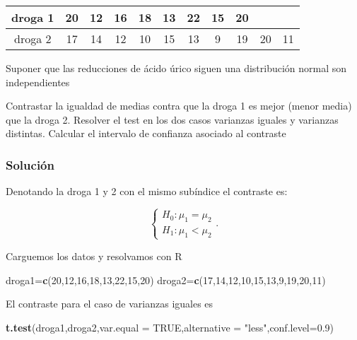 \documentclass[
]{article}
\newenvironment{Shaded}{\begin{snugshade}}{\end{snugshade}}
\newcommand{\DataTypeTok}[1]{\textcolor[rgb]{0.13,0.29,0.53}{#1}}
\newcommand{\DecValTok}[1]{\textcolor[rgb]{0.00,0.00,0.81}{#1}}
\newcommand{\FloatTok}[1]{\textcolor[rgb]{0.00,0.00,0.81}{#1}}
\newcommand{\KeywordTok}[1]{\textcolor[rgb]{0.13,0.29,0.53}{\textbf{#1}}}
\newcommand{\NormalTok}[1]{#1}
\newcommand{\OtherTok}[1]{\textcolor[rgb]{0.56,0.35,0.01}{#1}}
\newcommand{\StringTok}[1]{\textcolor[rgb]{0.31,0.60,0.02}{#1}}
\begin{document}
\begin{center}
\begin{tabular}{|c|c|c|c|c|c|c|c|c|c|c|}
droga 1 & 20 & 12 & 16 & 18 & 13 & 22 & 15 & 20\\ \hline droga 2 & 17 & 14 & 12 & 10 & 15 &
13 & 9 & 19 & 20 & 11
\end{tabular}
\end{center}

Suponer que las reducciones de ácido úrico siguen una distribución
normal son independientes

Contrastar la igualdad de medias contra que la droga 1 es mejor (menor
media) que la droga 2. Resolver el test en los dos casos varianzas
iguales y varianzas distintas. Calcular el intervalo de confianza
asociado al contraste

\hypertarget{soluciuxf3n-2}{%
\subsubsection{Solución}\label{soluciuxf3n-2}}

Denotando la droga 1 y 2 con el mismo subíndice el contraste es:

\[
\left\{
\begin{array}{ll}
H_{0}:\mu_1=\mu_2\\
H_{1}:\mu_1 < \mu_2 
\end{array}
\right..
\]

Carguemos los datos y resolvamos con R

\begin{Shaded}
\begin{Highlighting}[]
\NormalTok{droga1=}\KeywordTok{c}\NormalTok{(}\DecValTok{20}\NormalTok{,}\DecValTok{12}\NormalTok{,}\DecValTok{16}\NormalTok{,}\DecValTok{18}\NormalTok{,}\DecValTok{13}\NormalTok{,}\DecValTok{22}\NormalTok{,}\DecValTok{15}\NormalTok{,}\DecValTok{20}\NormalTok{)}
\NormalTok{droga2=}\KeywordTok{c}\NormalTok{(}\DecValTok{17}\NormalTok{,}\DecValTok{14}\NormalTok{,}\DecValTok{12}\NormalTok{,}\DecValTok{10}\NormalTok{,}\DecValTok{15}\NormalTok{,}\DecValTok{13}\NormalTok{,}\DecValTok{9}\NormalTok{,}\DecValTok{19}\NormalTok{,}\DecValTok{20}\NormalTok{,}\DecValTok{11}\NormalTok{)}
\end{Highlighting}
\end{Shaded}

El contraste para el caso de varianzas iguales es

\begin{Shaded}
\begin{Highlighting}[]
\KeywordTok{t.test}\NormalTok{(droga1,droga2,}\DataTypeTok{var.equal =} \OtherTok{TRUE}\NormalTok{,}\DataTypeTok{alternative =} \StringTok{"less"}\NormalTok{,}\DataTypeTok{conf.level=}\FloatTok{0.9}\NormalTok{)}
\end{Highlighting}
\end{Shaded}
\end{document}
